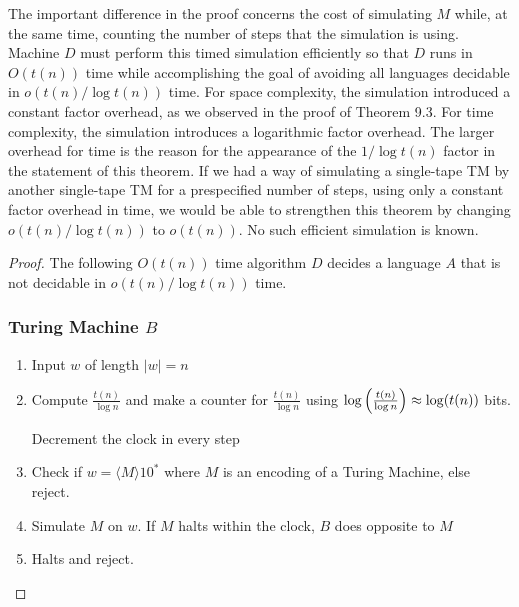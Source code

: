 \documentclass{article}
\begin{document}
	The important difference in the proof concerns the cost of simulating $M$ while, at the same time, counting the number of steps that the simulation is using. Machine $D$ must perform this timed simulation efficiently so that $D$ runs in $O(t(n))$ time while accomplishing the goal of avoiding all languages decidable in $o(t(n) / \log t(n))$ time. For space complexity, the simulation introduced a constant factor overhead, as we observed in the proof of Theorem 9.3. For time complexity, the simulation introduces a logarithmic factor overhead. The larger overhead for time is the reason for the appearance of the $1 / \log t(n)$ factor in the statement of this theorem. If we had a way of simulating a single-tape TM by another single-tape TM for a prespecified number of steps, using only a constant factor overhead in time, we would be able to strengthen this theorem by changing $o(t(n) / \log t(n))$ to $o(t(n))$. No such efficient simulation is known. 
	
	\begin{proof}
		The following $O(t(n))$ time algorithm $D$ decides a language $A$ that is not decidable in $o(t(n) / \log t(n))$ time.\subsubsection*{Turing Machine $B$}
		\begin{enumerate}
			\item Input $w$ of length $|w|=n$
			\item Compute $\frac{t(n)}{\log n}$ and make a counter for $\frac{t(n)}{\log n}$ using $\log \left(\frac{t(n)}{\log n}\right)\approx \log (t(n))$ bits.
			\parinn
			
			Decrement the clock in every step
			
			\item Check if $w=\langle M\rangle 10^*$ where $M$ is an encoding of  a Turing Machine, else reject.
			
			\item Simulate $M$ on $w$. If $M$ halts within the clock, $B$ does opposite to $M$
			\item Halts and reject.
		\end{enumerate}
	\begin{center}
	\end{center}
	\end{proof}
\pagebreak



\end{document}
